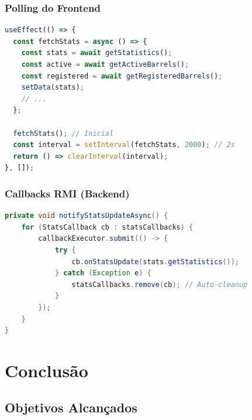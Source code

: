 \documentclass[12pt,a4paper]{article}
\begin{document}
\subsubsection{Polling do Frontend}
\begin{lstlisting}[language=JavaScript, caption={Polling a cada 2 segundos}]
useEffect(() => {
  const fetchStats = async () => {
    const stats = await getStatistics();
    const active = await getActiveBarrels();
    const registered = await getRegisteredBarrels();
    setData(stats);
    // ...
  };
  
  fetchStats(); // Inicial
  const interval = setInterval(fetchStats, 2000); // 2s
  return () => clearInterval(interval);
}, []);
\end{lstlisting}

\subsubsection{Callbacks RMI (Backend)}
\begin{lstlisting}[language=Java, caption={Notificação assíncrona}]
private void notifyStatsUpdateAsync() {
    for (StatsCallback cb : statsCallbacks) {
        callbackExecutor.submit(() -> {
            try {
                cb.onStatsUpdate(stats.getStatistics());
            } catch (Exception e) {
                statsCallbacks.remove(cb); // Auto-cleanup
            }
        });
    }
}
\end{lstlisting}

\newpage

\section{Conclusão}

\subsection{Objetivos Alcançados}
\end{document}
